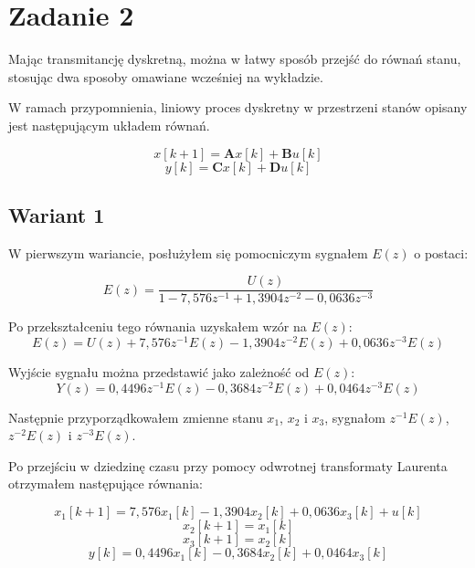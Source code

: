 \documentclass[a4paper,titlepage,11pt,floatssmall]{mwrep}
\begin{document}
\newpage
\section{Zadanie 2}
\indent{} Mając transmitancję dyskretną, można w łatwy sposób przejść do równań stanu, stosując dwa sposoby omawiane wcześniej na wykładzie. 

W ramach przypomnienia, liniowy proces dyskretny w przestrzeni stanów opisany jest następującym układem równań. 

\begin{equation*}
x[k+1] = \mathbf{A}x[k] + \mathbf{B}u[k] 
\end{equation*}
\begin{equation*}
y[k] = \mathbf{C}x[k] + \mathbf{D}u[k] 
\end{equation*}

\subsection{Wariant 1}
\indent{} W pierwszym wariancie, posłużyłem się pomocniczym sygnałem $E(z)$ o postaci:

\begin{equation*}
E(z) = \frac{U(z)}{1 - 7,576z^{-1} + 1,3904z^{-2} - 0,0636z^{-3}}
\end{equation*}

Po przekształceniu tego równania uzyskałem wzór na $E(z)$:
\begin{equation*}
E(z) = U(z) +  7,576z^{-1}E(z) - 1,3904z^{-2}E(z) + 0,0636z^{-3}E(z)
\end{equation*}

Wyjście sygnału można przedstawić jako zależność od $E(z)$:
\begin{equation*}
Y(z) = 0,4496z^{-1}E(z) - 0,3684z^{-2}E(z) + 0,0464z^{-3}E(z)
\end{equation*}

Następnie przyporządkowałem zmienne stanu $x_1$, $x_2$ i $x_3$, sygnałom $z^{-1}E(z)$, $z^{-2}E(z)$ i $z^{-3}E(z)$.

Po przejściu w dziedzinę czasu przy pomocy odwrotnej transformaty Laurenta otrzymałem następujące równania:


\begin{equation*}
x_1[k+1] = 7,576x_1[k] - 1,3904x_2[k] + 0,0636x_3[k] + u[k]
\end{equation*}
\begin{equation*}
x_2[k+1] = x_1[k]
\end{equation*}
\begin{equation*}
x_3[k+1] = x_2[k]
\end{equation*}
\begin{equation*}
y[k] = 0,4496x_1[k]- 0,3684x_2[k] + 0,0464x_3[k]
\end{equation*}
\end{document}
